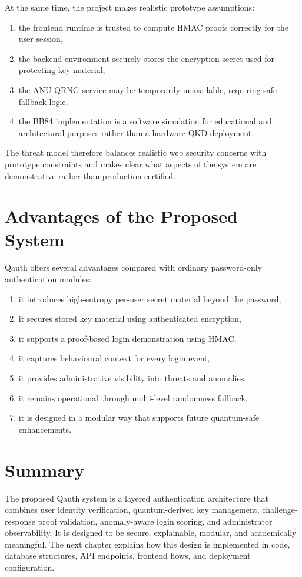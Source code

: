At the same time, the project makes realistic prototype assumptions:

\begin{enumerate}
    \item the frontend runtime is trusted to compute HMAC proofs correctly for the user session,
    \item the backend environment securely stores the encryption secret used for protecting key material,
    \item the ANU QRNG service may be temporarily unavailable, requiring safe fallback logic,
    \item the BB84 implementation is a software simulation for educational and architectural purposes rather than a hardware QKD deployment.
\end{enumerate}

The threat model therefore balances realistic web security concerns with prototype constraints and makes clear what aspects of the system are demonstrative rather than production-certified.

\section{Advantages of the Proposed System}
Qauth offers several advantages compared with ordinary password-only authentication modules:

\begin{enumerate}
    \item it introduces high-entropy per-user secret material beyond the password,
    \item it secures stored key material using authenticated encryption,
    \item it supports a proof-based login demonstration using HMAC,
    \item it captures behavioural context for every login event,
    \item it provides administrative visibility into threats and anomalies,
    \item it remains operational through multi-level randomness fallback,
    \item it is designed in a modular way that supports future quantum-safe enhancements.
\end{enumerate}

\section{Summary}
The proposed Qauth system is a layered authentication architecture that combines user identity verification, quantum-derived key management, challenge-response proof validation, anomaly-aware login scoring, and administrator observability. It is designed to be secure, explainable, modular, and academically meaningful. The next chapter explains how this design is implemented in code, database structures, API endpoints, frontend flows, and deployment configuration.
